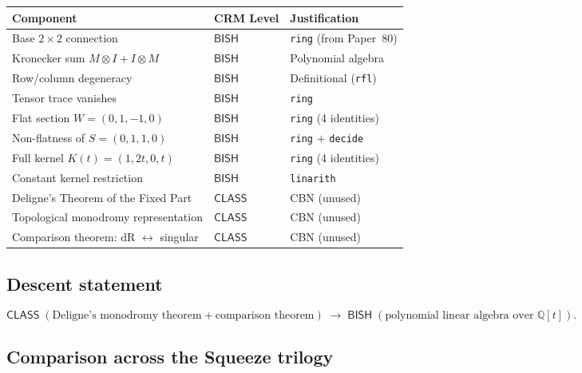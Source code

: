 \documentclass[11pt]{article}
\theoremstyle{plain}
\theoremstyle{definition}
\theoremstyle{remark}
\newcommand{\Q}{\mathbb{Q}}
\newcommand{\BISH}{\mathsf{BISH}}
\newcommand{\CLASS}{\mathsf{CLASS}}
\begin{document}
\begin{center}
\begin{tabular}{lll}
\toprule
\textbf{Component} & \textbf{CRM Level} & \textbf{Justification} \\
\midrule
Base $2 \times 2$ connection & $\BISH$ & \texttt{ring} (from Paper~80) \\
Kronecker sum $M \otimes I + I \otimes M$ & $\BISH$ & Polynomial algebra \\
Row/column degeneracy & $\BISH$ & Definitional (\texttt{rfl}) \\
Tensor trace vanishes & $\BISH$ & \texttt{ring} \\
Flat section $W = (0,1,-1,0)$ & $\BISH$ & \texttt{ring} (4 identities) \\
Non-flatness of $S = (0,1,1,0)$ & $\BISH$ & \texttt{ring} $+$ \texttt{decide} \\
Full kernel $K(t) = (1,2t,0,t)$ & $\BISH$ & \texttt{ring} (4 identities) \\
Constant kernel restriction & $\BISH$ & \texttt{linarith} \\
\rowcolor{red!8}
Deligne's Theorem of the Fixed Part & $\CLASS$ & CBN (unused) \\
\rowcolor{red!8}
Topological monodromy representation & $\CLASS$ & CBN (unused) \\
\rowcolor{red!8}
Comparison theorem: dR $\leftrightarrow$ singular & $\CLASS$ & CBN (unused) \\
\bottomrule
\end{tabular}
\end{center}

\subsection{Descent statement}

\[
\CLASS \;(\text{Deligne's monodromy theorem} + \text{comparison theorem})
\;\longrightarrow\;
\BISH \;(\text{polynomial linear algebra over } \Q[t]).
\]

\subsection{Comparison across the Squeeze trilogy}
\end{document}
